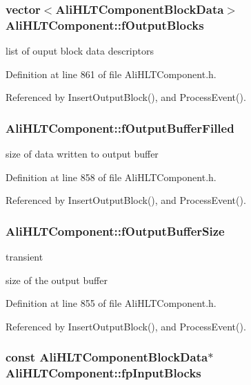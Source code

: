 \subsubsection{\setlength{\rightskip}{0pt plus 5cm}vector$<${\bf Ali\-HLTComponent\-Block\-Data}$>$ {\bf Ali\-HLTComponent::f\-Output\-Blocks}\hspace{0.3cm}{\tt  [private]}}\label{classAliHLTComponent_r13}


list of ouput block data descriptors 

Definition at line 861 of file Ali\-HLTComponent.h.

Referenced by Insert\-Output\-Block(), and Process\-Event().
\subsubsection{ {\bf Ali\-HLTComponent::f\-Output\-Buffer\-Filled}\hspace{0.3cm}{\tt  [private]}}\label{classAliHLTComponent_r12}


size of data written to output buffer 

Definition at line 858 of file Ali\-HLTComponent.h.

Referenced by Insert\-Output\-Block(), and Process\-Event().
\subsubsection{ {\bf Ali\-HLTComponent::f\-Output\-Buffer\-Size}\hspace{0.3cm}{\tt  [private]}}\label{classAliHLTComponent_r11}


transient 

size of the output buffer 

Definition at line 855 of file Ali\-HLTComponent.h.

Referenced by Insert\-Output\-Block(), and Process\-Event().
\subsubsection{\setlength{\rightskip}{0pt plus 5cm}const {\bf Ali\-HLTComponent\-Block\-Data}$\ast$ {\bf Ali\-HLTComponent::fp\-Input\-Blocks}\hspace{0.3cm}{\tt  [private]}}\label{classAliHLTComponent_r5}


